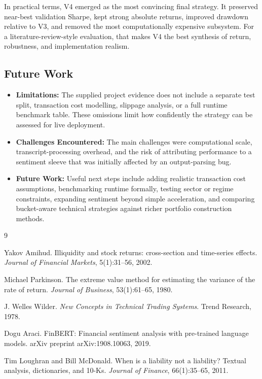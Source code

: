 \documentclass[11pt,twoside,a4paper]{article}
\begin{document}
In practical terms, V4 emerged as the most convincing final strategy. It preserved near-best validation Sharpe, kept strong absolute returns, improved drawdown relative to V3, and removed the most computationally expensive subsystem. For a literature-review-style evaluation, that makes V4 the best synthesis of return, robustness, and implementation realism.

\subsection{Future Work}
\begin{itemize}
    \item \textbf{Limitations:} The supplied project evidence does not include a separate test split, transaction cost modelling, slippage analysis, or a full runtime benchmark table. These omissions limit how confidently the strategy can be assessed for live deployment.
    \item \textbf{Challenges Encountered:} The main challenges were computational scale, transcript-processing overhead, and the risk of attributing performance to a sentiment sleeve that was initially affected by an output-parsing bug.
    \item \textbf{Future Work:} Useful next steps include adding realistic transaction cost assumptions, benchmarking runtime formally, testing sector or regime constraints, expanding sentiment beyond simple acceleration, and comparing bucket-aware technical strategies against richer portfolio construction methods.
\end{itemize}

\newpage
\begin{thebibliography}{9}

Yakov Amihud.
\newblock Illiquidity and stock returns: cross-section and time-series effects.
\newblock \emph{Journal of Financial Markets}, 5(1):31--56, 2002.

Michael Parkinson.
\newblock The extreme value method for estimating the variance of the rate of return.
\newblock \emph{Journal of Business}, 53(1):61--65, 1980.

J. Welles Wilder.
\newblock \emph{New Concepts in Technical Trading Systems}.
\newblock Trend Research, 1978.

Dogu Araci.
\newblock FinBERT: Financial sentiment analysis with pre-trained language models.
\newblock arXiv preprint arXiv:1908.10063, 2019.

Tim Loughran and Bill McDonald.
\newblock When is a liability not a liability? Textual analysis, dictionaries, and 10-Ks.
\newblock \emph{Journal of Finance}, 66(1):35--65, 2011.

\end{thebibliography}
\end{document}
